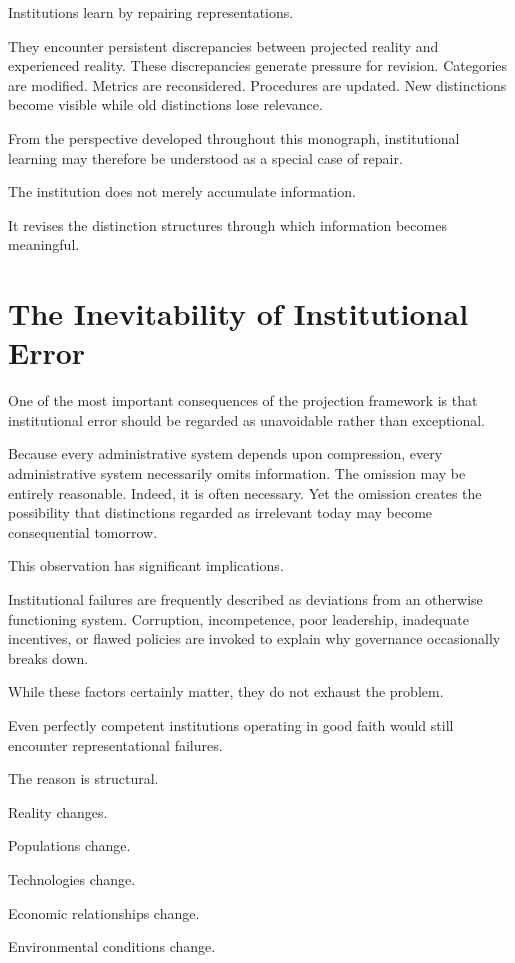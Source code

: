 \documentclass[11pt,oneside,openany]{book}
\begin{document}
Institutions learn by repairing representations.

They encounter persistent discrepancies between projected reality and experienced reality. These discrepancies generate pressure for revision. Categories are modified. Metrics are reconsidered. Procedures are updated. New distinctions become visible while old distinctions lose relevance.

From the perspective developed throughout this monograph, institutional learning may therefore be understood as a special case of repair.

The institution does not merely accumulate information.

It revises the distinction structures through which information becomes meaningful.

\section{The Inevitability of Institutional Error}

One of the most important consequences of the projection framework is that institutional error should be regarded as unavoidable rather than exceptional.

Because every administrative system depends upon compression, every administrative system necessarily omits information. The omission may be entirely reasonable. Indeed, it is often necessary. Yet the omission creates the possibility that distinctions regarded as irrelevant today may become consequential tomorrow.

This observation has significant implications.

Institutional failures are frequently described as deviations from an otherwise functioning system. Corruption, incompetence, poor leadership, inadequate incentives, or flawed policies are invoked to explain why governance occasionally breaks down.

While these factors certainly matter, they do not exhaust the problem.

Even perfectly competent institutions operating in good faith would still encounter representational failures.

The reason is structural.

Reality changes.

Populations change.

Technologies change.

Economic relationships change.

Environmental conditions change.
\end{document}
